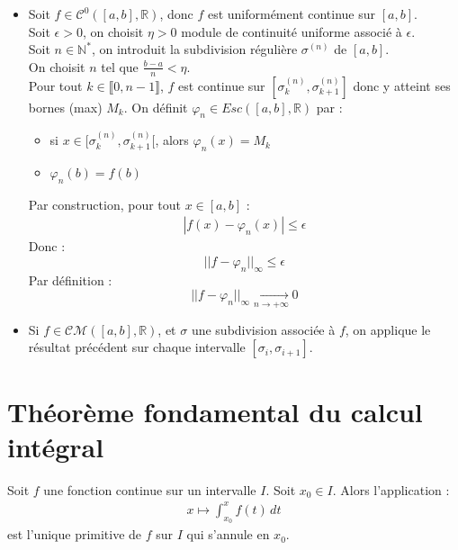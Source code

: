 \documentclass[../main.tex]{subfiles}
\begin{document}
\begin{itemize}
    \item Soit $f\in \mathcal{C}^0([a, b], \mathbb{R})$, donc $f$ est uniformément continue sur $[a, b]$. \\
    Soit $\epsilon > 0$, on choisit $\eta > 0$ module de continuité uniforme associé à $\epsilon$. \\
    Soit $n\in \mathbb{N}^*$, on introduit la subdivision régulière $\sigma^{(n)}$ de $[a, b]$. \\
    On choisit $n$ tel que $\frac{b-a}{n} < \eta$. \\
    Pour tout $k\in \llbracket 0, n-1 \rrbracket$, $f$ est continue sur $[\sigma_k^{(n)}, \sigma_{k+1}^{(n)}]$ donc y atteint ses bornes (max) $M_k$. On définit $\varphi_n \in Esc([a, b], \mathbb{R})$ par :
    \begin{itemize}
        \item si $x\in [\sigma_k^{(n)}, \sigma_{k+1}^{(n)}[$, alors $\varphi_n(x) = M_k$ \\
        \item $\varphi_n(b) = f(b)$
    \end{itemize}
    Par construction, pour tout $x\in [a, b]$ : 
    \begin{align*}
        |f(x) - \varphi_n(x)| \leq \epsilon
    \end{align*}
    Donc :
    $$||f - \varphi_n||_{\infty} \leq \epsilon$$
    Par définition :
    $$||f - \varphi_n||_{\infty} \underset{n \to +\infty}{\longrightarrow} 0$$
    \item Si $f\in \mathcal{CM}([a, b], \mathbb{R})$, et $\sigma$ une subdivision associée à $f$, on applique le résultat précédent sur chaque intervalle $[\sigma_i, \sigma_{i+1}]$. \\
\end{itemize}

\section{Théorème fondamental du calcul intégral}
\begin{tcolorbox}[title=Théorème 26.64, title filled=false, colframe=orange, colback=orange!10!white]
    Soit $f$ une fonction continue sur un intervalle $I$. Soit $x_0\in I$. Alors l'application : 
    \begin{align*}
        x\mapsto \int_{x_0}^{x} f(t) \,dt
    \end{align*}
    est l'unique primitive de $f$ sur $I$ qui s'annule en $x_0$. \\
\end{tcolorbox}
\end{document}
